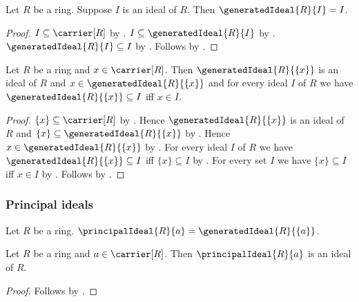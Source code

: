 \begin{corollary}\label{generated_ideal_of_ideal}
    Let $R$ be a ring.
    Suppose $I$ is an ideal of $R$.
    Then $\generatedIdeal{R}{I}=I$.
\end{corollary}
\begin{proof}
    $I\subseteq\carrier[R]$ by
        .
    $I\subseteq\generatedIdeal{R}{I}$ by
        .
    $\generatedIdeal{R}{I}\subseteq I$ by
        .
    Follows by .
\end{proof}

\begin{theorem}\label{principal_ideal_properties}
    Let $R$ be a ring and $x\in\carrier[R]$.
    Then $\generatedIdeal{R}{\{x\}}$ is an ideal of $R$ and
        $x\in\generatedIdeal{R}{\{x\}}$ and
        for every ideal $I$ of $R$ we have
            $\generatedIdeal{R}{\{x\}}\subseteq I$ iff $x\in I$.
\end{theorem}
\begin{proof}
    $\{x\}\subseteq\carrier[R]$ by .
    Hence $\generatedIdeal{R}{\{x\}}$ is an ideal of $R$ and
        $\{x\}\subseteq\generatedIdeal{R}{\{x\}}$ by
        .
    Hence $x\in\generatedIdeal{R}{\{x\}}$ by
        .
    For every ideal $I$ of $R$ we have
        $\generatedIdeal{R}{\{x\}}\subseteq I$ iff
        $\{x\}\subseteq I$ by
        .
    For every set $I$ we have $\{x\}\subseteq I$ iff $x\in I$ by
        .
    Follows by \auto.
\end{proof}

\subsubsection{Principal ideals}

\begin{definition}\label{principal_ideal}
    Let $R$ be a ring.
    $\principalIdeal{R}{a}=\generatedIdeal{R}{\{a\}}$.
\end{definition}

\begin{theorem}\label{principal_ideal_is_ideal}
    Let $R$ be a ring and $a\in\carrier[R]$.
    Then $\principalIdeal{R}{a}$ is an ideal of $R$.
\end{theorem}
\begin{proof}
    Follows by
        .
\end{proof}

